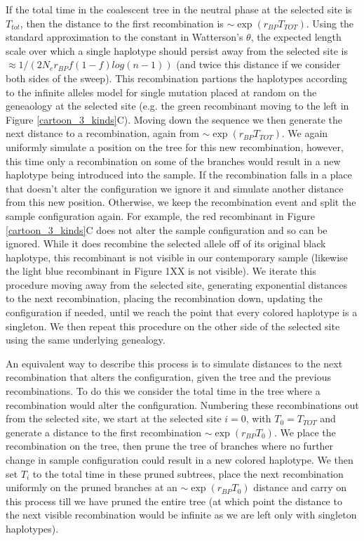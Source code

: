 \documentclass[a4paper,10pt]{article}
\begin{document}
If the total time in the coalescent tree in the neutral phase at the selected site is $T_{tot}$, then the distance to the first recombination is $\sim \exp \left( r_{BP} T_{TOT} \right)$. Using the standard approximation to the constant in Watterson's $\theta$, the expected length scale over which a single haplotype should persist away from the selected site is $\approx 1/( 2 N_e r_{BP}f\left(1-f\right) log(n-1))$ (and twice this distance if we consider both sides of the sweep). This recombination partions the haplotypes according to the infinite alleles model for single mutation placed at random on the geneaology at the selected site (e.g. the green recombinant moving to the left in Figure \ref{cartoon_3_kinds}C). Moving down the sequence we then generate the next distance to a recombination, again from $\sim \exp \left( r_{BP} T_{TOT} \right)$. We again uniformly simulate a position on the tree for this new recombination, however, this time only a recombination on some of the branches would result in a new haplotype being introduced into the sample. If the recombination falls in a place that doesn't alter the configuration we ignore it and simulate another distance from this new position. Otherwise, we keep the recombination event and split the sample configuration again. For example, the red recombinant in Figure \ref{cartoon_3_kinds}C does not alter the sample configuration and so can be ignored. While it does recombine the selected allele off of its original black haplotype, this recombinant is not visible in our contemporary sample (likewise the light blue recombinant in Figure 1XX is not visible). We iterate this procedure moving away from the selected site, generating exponential distances to the next recombination, placing the recombination down, updating the configuration if needed, until we reach the point that every colored haplotype is a singleton. We then repeat this procedure on the other side of the selected site using the same underlying genealogy.

An equivalent way to describe this process is to simulate distances to the next recombination that alters the configuration, given the tree and the previous recombinations. To do this we consider the total time in the tree where a recombination would alter the configuration. Numbering these recombinations out from the selected site,  we start at the selected site $i=0$, with $T_0 = T_{TOT}$ and generate a distance to the first recombination $\sim \exp(r_{BP} T_0)$. We place the recombination on the tree, then prune the tree of branches where no further change in sample configuration could result in a new colored haplotype. We then set $T_i$ to the total time in these pruned subtrees, place the next recombination uniformly on the pruned branches at an $\sim \exp(r_{BP} T_0)$ distance and carry on this process till we have pruned the entire tree (at which point the distance to the next visible recombination would be infinite as we are left only with singleton haplotypes). 
\end{document}
